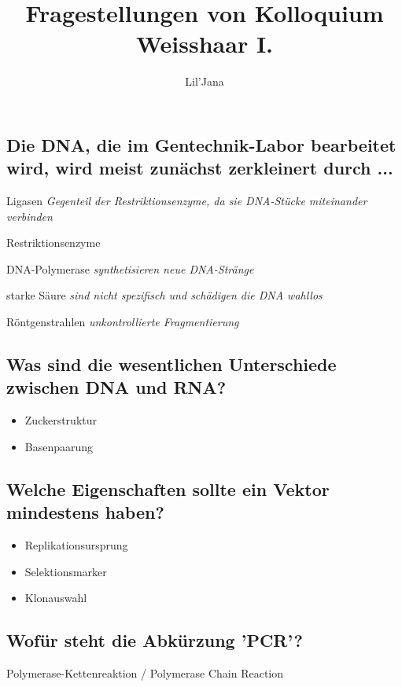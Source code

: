 \documentclass{article}
\title{Fragestellungen von Kolloquium Weisshaar I.}
\author{Lil'Jana}
\newcommand{\cmark}{\ding{51}}%
\newcommand{\done}{\rlap{$\square$}{\raisebox{2pt}{\large\hspace{1pt}\cmark}}%
\hspace{-2.5pt}}
\begin{document}
\maketitle
\subsection*{Die DNA, die im Gentechnik-Labor bearbeitet wird, wird meist zunächst zerkleinert durch ...}
\begin{todolist}
\item Ligasen \textit{\scriptsize Gegenteil der Restriktionsenzyme, da sie DNA-Stücke miteinander verbinden }
\item [\done] Restriktionsenzyme
\item DNA-Polymerase \textit{\scriptsize synthetisieren neue DNA-Stränge}
\item starke Säure \textit{\scriptsize sind nicht spezifisch und schädigen die DNA wahllos}
\item Röntgenstrahlen \textit{\scriptsize unkontrollierte Fragmentierung}
\end{todolist}
\subsection*{Was sind die wesentlichen Unterschiede zwischen DNA und RNA?}
\begin{itemize}
    \item Zuckerstruktur
    \item Basenpaarung
\end{itemize}
\subsection*{Welche Eigenschaften sollte ein Vektor mindestens haben?}
\begin{itemize}
    \item Replikationsursprung
    \item Selektionsmarker
    \item Klonauswahl   
\end{itemize}
\subsection*{Wofür steht die Abkürzung 'PCR'?}
Polymerase-Kettenreaktion / Polymerase Chain Reaction
\end{document}
